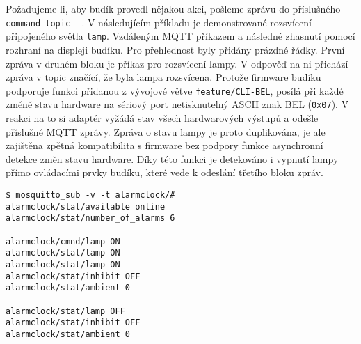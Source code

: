 Požadujeme-li, aby budík provedl nějakou akci, pošleme zprávu do příslušného
\texttt{command topic} -- .
V následujícím příkladu je demonstrované rozsvícení připojeného světla
\texttt{lamp}. Vzdáleným MQTT příkazem a následné zhasnutí pomocí rozhraní na
displeji budíku. Pro přehlednost byly přidány prázdné řádky. První zpráva
v druhém bloku je příkaz pro rozsvícení lampy. V odpověď na ni přichází zpráva
v topic  značící, že byla lampa rozsvícena. Protože
firmware budíku podporuje funkci přidanou z vývojové větve
\texttt{feature/CLI-BEL}, posílá při každé změně stavu hardware na sériový port
netisknutelný ASCII znak BEL (\texttt{0x07}). V reakci na to si adaptér vyžádá
stav všech hardwarových výstupů a odešle příslušné MQTT zprávy. Zpráva o stavu
lampy je proto duplikována, je ale zajištěna zpětná kompatibilita s firmware
bez podpory funkce asynchronní detekce změn stavu hardware.
Díky této funkci je detekováno i vypnutí lampy přímo ovládacími prvky budíku,
které vede k odeslání třetího bloku zpráv.
\begin{lstlisting}[style=terminal]
$ mosquitto_sub -v -t alarmclock/#
alarmclock/stat/available online
alarmclock/stat/number_of_alarms 6

alarmclock/cmnd/lamp ON
alarmclock/stat/lamp ON
alarmclock/stat/lamp ON
alarmclock/stat/inhibit OFF
alarmclock/stat/ambient 0

alarmclock/stat/lamp OFF
alarmclock/stat/inhibit OFF
alarmclock/stat/ambient 0
\end{lstlisting}

